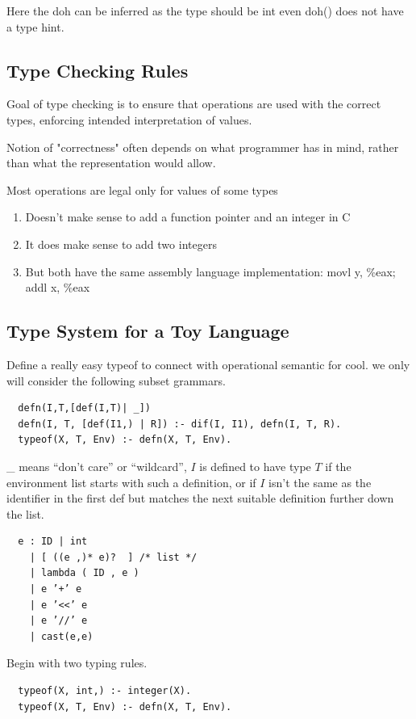 \documentclass[a4paper]{article}
\theoremstyle{definition}
\begin{document}
Here the doh can be inferred as the type should be int even doh() does not have a type hint.
\subsection{Type Checking Rules}
Goal of type checking is to ensure that operations are used with the correct types, enforcing intended interpretation of values.

Notion of "correctness" often depends on what programmer has in mind, rather than what the representation would allow.

Most operations are legal only for values of some types
\begin{enumerate}
  \item Doesn’t make sense to add a function pointer and an integer in C
  \item It does make sense to add two integers
  \item But both have the same assembly language implementation: movl y, \%eax;  addl x, \%eax
\end{enumerate}

\subsection{Type System for a Toy Language}
Define a really easy typeof to connect with operational semantic for cool. we only will consider the following subset grammars.
\begin{verbatim}
  defn(I,T,[def(I,T)| _])
  defn(I, T, [def(I1,) | R]) :- dif(I, I1), defn(I, T, R).
  typeof(X, T, Env) :- defn(X, T, Env).
  \end{verbatim}
  \_ means “don’t care” or “wildcard”, $I$ is defined to have type $T$ if the environment list starts with such a definition, or if $I$ isn't the same as the identifier in the first def but matches the next suitable definition further down the list.
\begin{verbatim}
  e : ID | int
    | [ ((e ,)* e)?  ] /* list */
    | lambda ( ID , e )
    | e ’+’ e
    | e ’<<’ e
    | e ’//’ e
    | cast(e,e)
\end{verbatim}

Begin with two typing rules.
\begin{verbatim}
  typeof(X, int,) :- integer(X).
  typeof(X, T, Env) :- defn(X, T, Env).
\end{verbatim}
\end{document}

